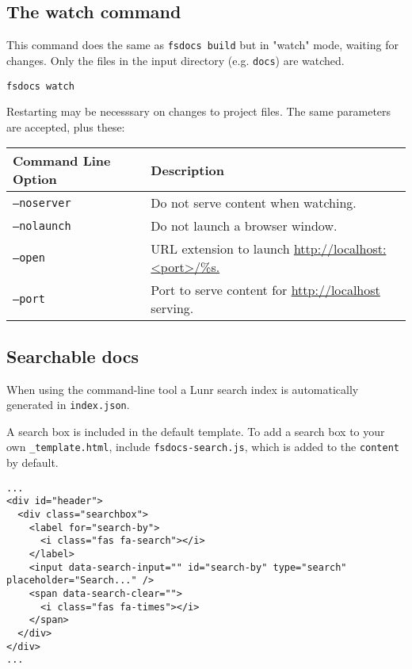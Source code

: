 \documentclass{article}
\begin{document}
\subsection*{The watch command}



This command does the same as \texttt{fsdocs build} but in "watch" mode, waiting for changes. Only the files in the input
directory (e.g. \texttt{docs}) are watched.
\begin{lstlisting}
fsdocs watch

\end{lstlisting}


Restarting may be necesssary on changes to project files. The same parameters are accepted, plus these:
\begin{tabular}{|l|l|}\hline
\textbf{Command Line Option} & \textbf{Description}\\ \hline\hline
\texttt{--noserver} & Do not serve content when watching.\\ \hline
\texttt{--nolaunch} & Do not launch a browser window.\\ \hline
\texttt{--open} & URL extension to launch \href{http://localhost:<port>/\%s.}{http://localhost:<port>/\%s.}\\ \hline
\texttt{--port} & Port to serve content for \href{http://localhost}{http://localhost} serving.\\ \hline
\end{tabular}

\subsection*{Searchable docs}



When using the command-line tool a Lunr search index is automatically generated in \texttt{index.json}.


A search box is included in the default template.  To add a search box
to your own \texttt{\_template.html}, include \texttt{fsdocs-search.js}, which is added to the \texttt{content}
by default.
\begin{lstlisting}
...
<div id="header">
  <div class="searchbox">
    <label for="search-by">
      <i class="fas fa-search"></i>
    </label>
    <input data-search-input="" id="search-by" type="search" placeholder="Search..." />
    <span data-search-clear="">
      <i class="fas fa-times"></i>
    </span>
  </div>
</div>
...

\end{lstlisting}
\end{document}
